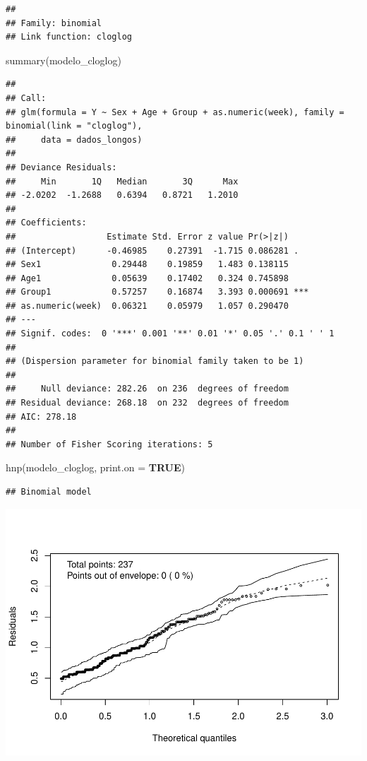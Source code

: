 \documentclass[
]{article}
\newenvironment{Shaded}{\begin{snugshade}}{\end{snugshade}}
\newcommand{\AttributeTok}[1]{\textcolor[rgb]{0.80,0.80,0.80}{#1}}
\newcommand{\ConstantTok}[1]{\textcolor[rgb]{0.86,0.64,0.64}{\textbf{#1}}}
\newcommand{\FunctionTok}[1]{\textcolor[rgb]{0.94,0.94,0.56}{#1}}
\newcommand{\NormalTok}[1]{\textcolor[rgb]{0.80,0.80,0.80}{#1}}
\begin{document}
\begin{verbatim}
## 
## Family: binomial 
## Link function: cloglog
\end{verbatim}

\begin{Shaded}
\begin{Highlighting}[]
\FunctionTok{summary}\NormalTok{(modelo\_cloglog)}
\end{Highlighting}
\end{Shaded}

\begin{verbatim}
## 
## Call:
## glm(formula = Y ~ Sex + Age + Group + as.numeric(week), family = binomial(link = "cloglog"), 
##     data = dados_longos)
## 
## Deviance Residuals: 
##     Min       1Q   Median       3Q      Max  
## -2.0202  -1.2688   0.6394   0.8721   1.2010  
## 
## Coefficients:
##                  Estimate Std. Error z value Pr(>|z|)    
## (Intercept)      -0.46985    0.27391  -1.715 0.086281 .  
## Sex1              0.29448    0.19859   1.483 0.138115    
## Age1              0.05639    0.17402   0.324 0.745898    
## Group1            0.57257    0.16874   3.393 0.000691 ***
## as.numeric(week)  0.06321    0.05979   1.057 0.290470    
## ---
## Signif. codes:  0 '***' 0.001 '**' 0.01 '*' 0.05 '.' 0.1 ' ' 1
## 
## (Dispersion parameter for binomial family taken to be 1)
## 
##     Null deviance: 282.26  on 236  degrees of freedom
## Residual deviance: 268.18  on 232  degrees of freedom
## AIC: 278.18
## 
## Number of Fisher Scoring iterations: 5
\end{verbatim}

\begin{Shaded}
\begin{Highlighting}[]
\FunctionTok{hnp}\NormalTok{(modelo\_cloglog, }\AttributeTok{print.on =} \ConstantTok{TRUE}\NormalTok{)}
\end{Highlighting}
\end{Shaded}

\begin{verbatim}
## Binomial model
\end{verbatim}

\includegraphics{EDA__files/figure-latex/unnamed-chunk-9-1.pdf}
\end{document}
